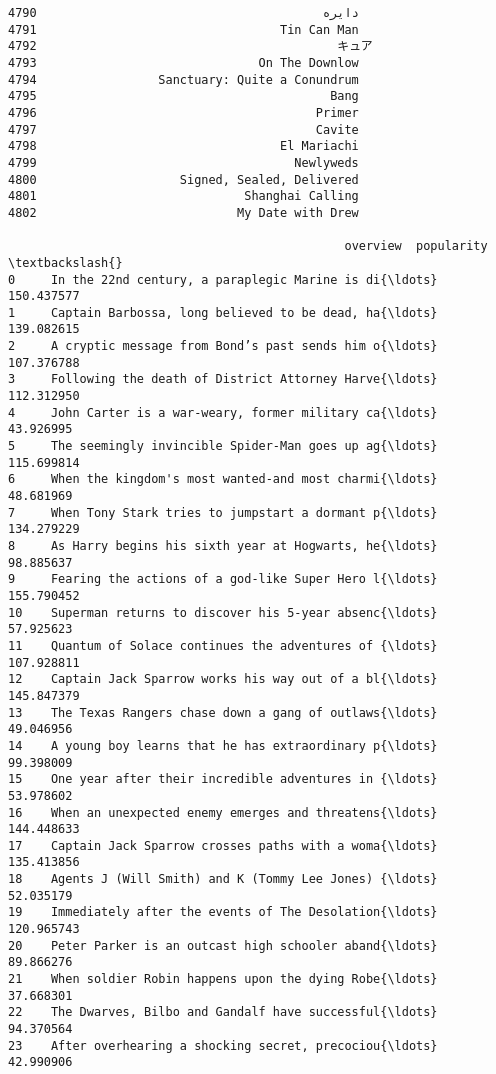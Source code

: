 \documentclass[11pt]{article}
\begin{document}
\begin{Verbatim}[commandchars=\\\{\}]
4790                                        دایره   
4791                                  Tin Can Man   
4792                                          キュア   
4793                               On The Downlow   
4794                 Sanctuary: Quite a Conundrum   
4795                                         Bang   
4796                                       Primer   
4797                                       Cavite   
4798                                  El Mariachi   
4799                                    Newlyweds   
4800                    Signed, Sealed, Delivered   
4801                             Shanghai Calling   
4802                            My Date with Drew   

                                               overview  popularity  \textbackslash{}
0     In the 22nd century, a paraplegic Marine is di{\ldots}  150.437577   
1     Captain Barbossa, long believed to be dead, ha{\ldots}  139.082615   
2     A cryptic message from Bond’s past sends him o{\ldots}  107.376788   
3     Following the death of District Attorney Harve{\ldots}  112.312950   
4     John Carter is a war-weary, former military ca{\ldots}   43.926995   
5     The seemingly invincible Spider-Man goes up ag{\ldots}  115.699814   
6     When the kingdom's most wanted-and most charmi{\ldots}   48.681969   
7     When Tony Stark tries to jumpstart a dormant p{\ldots}  134.279229   
8     As Harry begins his sixth year at Hogwarts, he{\ldots}   98.885637   
9     Fearing the actions of a god-like Super Hero l{\ldots}  155.790452   
10    Superman returns to discover his 5-year absenc{\ldots}   57.925623   
11    Quantum of Solace continues the adventures of {\ldots}  107.928811   
12    Captain Jack Sparrow works his way out of a bl{\ldots}  145.847379   
13    The Texas Rangers chase down a gang of outlaws{\ldots}   49.046956   
14    A young boy learns that he has extraordinary p{\ldots}   99.398009   
15    One year after their incredible adventures in {\ldots}   53.978602   
16    When an unexpected enemy emerges and threatens{\ldots}  144.448633   
17    Captain Jack Sparrow crosses paths with a woma{\ldots}  135.413856   
18    Agents J (Will Smith) and K (Tommy Lee Jones) {\ldots}   52.035179   
19    Immediately after the events of The Desolation{\ldots}  120.965743   
20    Peter Parker is an outcast high schooler aband{\ldots}   89.866276   
21    When soldier Robin happens upon the dying Robe{\ldots}   37.668301   
22    The Dwarves, Bilbo and Gandalf have successful{\ldots}   94.370564   
23    After overhearing a shocking secret, precociou{\ldots}   42.990906   

\end{Verbatim}
\end{document}
